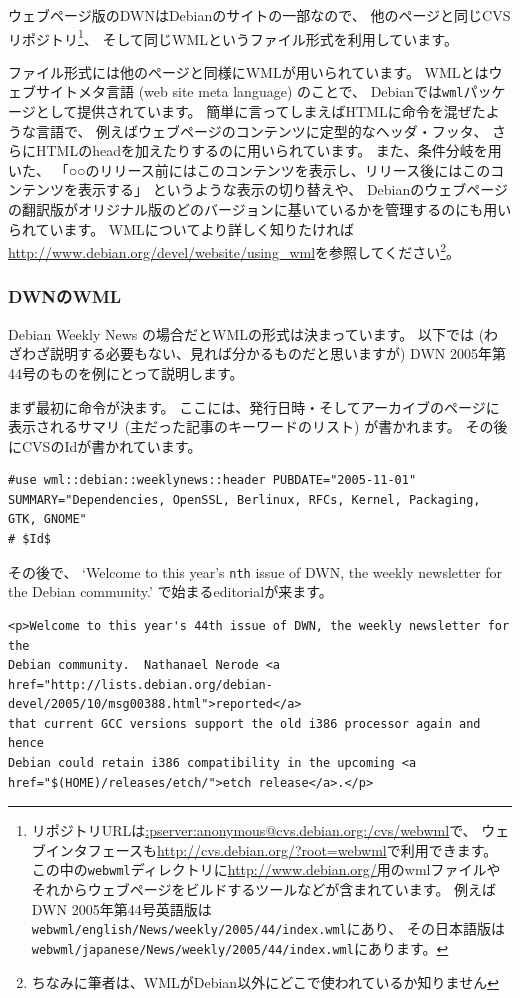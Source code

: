 \documentclass[mingoth,a4paper]{jsarticle}
\begin{document}
ウェブページ版のDWNはDebianのサイトの一部なので、
他のページと同じCVSリポジトリ\footnote{リポジトリURLは\url{:pserver:anonymous@cvs.debian.org:/cvs/webwml}で、
ウェブインタフェースも\url{http://cvs.debian.org/?root=webwml}で利用できます。
この中の\texttt{webwml}ディレクトリに\url{http://www.debian.org/}用のwmlファイルやそれからウェブページをビルドするツールなどが含まれています。
例えばDWN 2005年第44号英語版は\texttt{webwml/english/News/weekly/2005/44/index.wml}にあり、
その日本語版は\texttt{webwml/japanese/News/weekly/2005/44/index.wml}にあります。}、
そして同じWMLというファイル形式を利用しています。

ファイル形式には他のページと同様にWMLが用いられています。
WMLとはウェブサイトメタ言語 (web site meta language) のことで、
Debianでは\verb|wml|パッケージとして提供されています。
簡単に言ってしまえばHTMLに命令を混ぜたような言語で、
例えばウェブページのコンテンツに定型的なヘッダ・フッタ、
さらにHTMLのheadを加えたりするのに用いられています。
また、条件分岐を用いた、
「○○のリリース前にはこのコンテンツを表示し、リリース後にはこのコンテンツを表示する」
というような表示の切り替えや、
Debianのウェブページの翻訳版がオリジナル版のどのバージョンに基いているかを管理するのにも用いられています。
WMLについてより詳しく知りたければ\url{http://www.debian.org/devel/website/using_wml}を参照してください\footnote{ちなみに筆者は、WMLがDebian以外にどこで使われているか知りません}。

\subsubsection{DWNのWML}

Debian Weekly News の場合だとWMLの形式は決まっています。
以下では (わざわざ説明する必要もない、見れば分かるものだと思いますが) DWN 2005年第44号のものを例にとって説明します。

まず最初に命令が決ます。
ここには、発行日時・そしてアーカイブのページに表示されるサマリ (主だった記事のキーワードのリスト) が書かれます。
その後にCVSのIdが書かれています。
\begin{verbatim}
#use wml::debian::weeklynews::header PUBDATE="2005-11-01" SUMMARY="Dependencies, OpenSSL, Berlinux, RFCs, Kernel, Packaging, GTK, GNOME"
# $Id$
\end{verbatim}

その後で、
`Welcome to this year's \verb|nth| issue of DWN, the weekly newsletter for the Debian community.'
で始まるeditorialが来ます。

\begin{verbatim}
<p>Welcome to this year's 44th issue of DWN, the weekly newsletter for the
Debian community.  Nathanael Nerode <a
href="http://lists.debian.org/debian-devel/2005/10/msg00388.html">reported</a>
that current GCC versions support the old i386 processor again and hence
Debian could retain i386 compatibility in the upcoming <a
href="$(HOME)/releases/etch/">etch release</a>.</p>
\end{verbatim}
\end{document}
